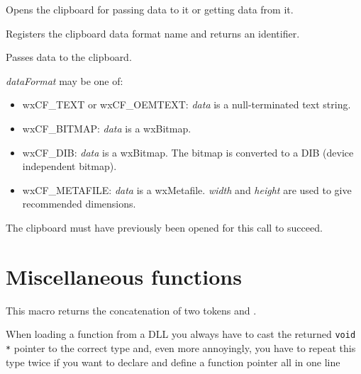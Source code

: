 \label{wxopenclipboard}


Opens the clipboard for passing data to it or getting data from it.


\label{wxregisterclipboardformat}


Registers the clipboard data format name and returns an identifier.


\label{wxsetclipboarddata}


Passes data to the clipboard.

{\it dataFormat} may be one of:

\begin{itemize}\itemsep=0pt
\item wxCF\_TEXT or wxCF\_OEMTEXT: {\it data} is a null-terminated text string.
\item wxCF\_BITMAP: {\it data} is a wxBitmap.
\item wxCF\_DIB: {\it data} is a wxBitmap. The bitmap is converted to a DIB (device independent bitmap).
\item wxCF\_METAFILE: {\it data} is a wxMetafile. {\it width} and {\it height} are used to give recommended dimensions.
\end{itemize}

The clipboard must have previously been opened for this call to succeed.


\section{Miscellaneous functions}\label{miscellany}


\label{wxconcat}


This macro returns the concatenation of two tokens  and .


\label{wxdynlibfunction}


When loading a function from a DLL you always have to cast the returned
{\tt void *} pointer to the correct type and, even more annoyingly, you have to
repeat this type twice if you want to declare and define a function pointer all
in one line

